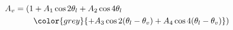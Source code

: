 \begin{align}
A_v=(1 &+ A_1\cos 2\theta_l + A_2\cos 4\theta_l \\
        & \color{grey}{+A_3\cos 2(\theta_l-\theta_v) + A_4\cos 4(\theta_l-\theta_v)})
\end{align}
